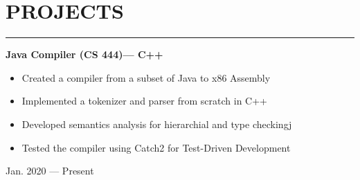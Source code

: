 \documentclass[9pt]{extarticle}
\begin{document}
\vfill



\section*{\large{PROJECTS}}
\rule[1em]{\textwidth}{0.3pt}

\begin{minipage}[t]{0.80\linewidth}
\begin{flushleft}
\textbf{Java Compiler (CS 444)--- C++}
\begin{itemize}
	\item Created a compiler from a subset of Java to x86 Assembly
	\item Implemented a tokenizer and parser from scratch in C++
	\item Developed semantics analysis for hierarchial and type checkingj
	\item Tested the compiler using Catch2 for Test-Driven Development
\end{itemize}

\end{flushleft}
\end{minipage}
\hfill
\begin{minipage}[t]{0.19\linewidth}
\begin{flushright}
Jan. 2020 --- Present
\end{flushright}
\end{minipage}
\end{document}
